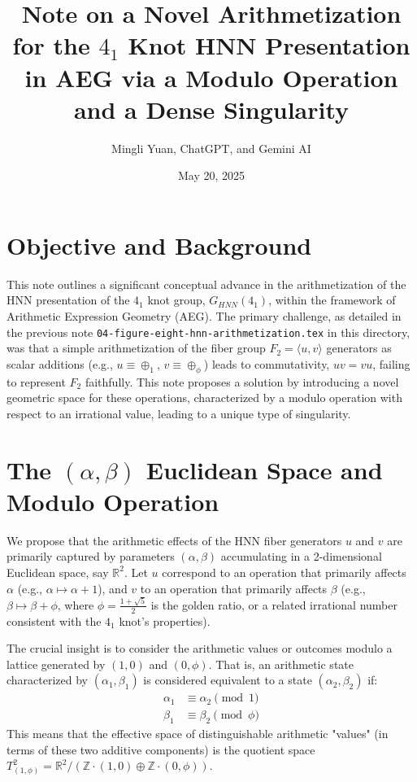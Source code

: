 \documentclass[12pt, a4paper]{article}
\title{Note on a Novel Arithmetization for the $4_1$ Knot HNN Presentation in AEG via a Modulo Operation and a Dense Singularity}
\author{Mingli Yuan, ChatGPT, and Gemini AI} %
\date{May 20, 2025} %
\begin{document}
\maketitle

\section{Objective and Background}
This note outlines a significant conceptual advance in the arithmetization of the HNN presentation of the $4_1$ knot group, $G_{HNN}(4_1)$, within the framework of Arithmetic Expression Geometry (AEG).
The primary challenge, as detailed in the previous note \texttt{04-figure-eight-hnn-arithmetization.tex} in this directory, was that a simple arithmetization of the fiber group $F_2 = \langle u, v \rangle$ generators as scalar additions (e.g., $u \equiv \oplus_1$, $v \equiv \oplus_\phi$) leads to commutativity, $uv=vu$, failing to represent $F_2$ faithfully. This note proposes a solution by introducing a novel geometric space for these operations, characterized by a modulo operation with respect to an irrational value, leading to a unique type of singularity.

\section{The $(\alpha, \beta)$ Euclidean Space and Modulo Operation}
We propose that the arithmetic effects of the HNN fiber generators $u$ and $v$ are primarily captured by parameters $(\alpha, \beta)$ accumulating in a 2-dimensional Euclidean space, say $\mathbb{R}^2$.
Let $u$ correspond to an operation that primarily affects $\alpha$ (e.g., $\alpha \mapsto \alpha + 1$), and $v$ to an operation that primarily affects $\beta$ (e.g., $\beta \mapsto \beta + \phi$, where $\phi = \frac{1+\sqrt{5}}{2}$ is the golden ratio, or a related irrational number consistent with the $4_1$ knot's properties).

The crucial insight is to consider the arithmetic values or outcomes modulo a lattice generated by $(1,0)$ and $(0,\phi)$. That is, an arithmetic state characterized by $(\alpha_1, \beta_1)$ is considered equivalent to a state $(\alpha_2, \beta_2)$ if:
\begin{align*}
    \alpha_1 &\equiv \alpha_2 \pmod 1 \\
    \beta_1 &\equiv \beta_2 \pmod \phi
\end{align*}
This means that the effective space of distinguishable arithmetic "values" (in terms of these two additive components) is the quotient space $T^2_{(1,\phi)} = \mathbb{R}^2 / (\mathbb{Z}\cdot(1,0) \oplus \mathbb{Z}\cdot(0,\phi))$.
\end{document}
